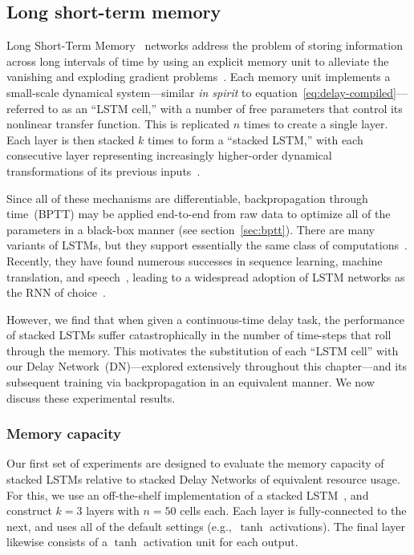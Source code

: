 \subsection{Long short-term memory}
\label{sec:delay-lstm}

Long Short-Term Memory~\citep[LSTM;][]{hochreiter1997long, gers1999learning} networks address the problem of storing information across long intervals of time by using an explicit memory unit to alleviate the vanishing and exploding gradient problems~\citep{bengio1994learning, bengio1994credit}.
Each memory unit implements a small-scale dynamical system---similar \emph{in spirit} to equation~\ref{eq:delay-compiled}---referred to as an ``LSTM cell,'' with a number of free parameters that control its nonlinear transfer function.
This is replicated $n$ times to create a single layer.
Each layer is then stacked $k$ times to form a ``stacked LSTM,'' with each consecutive layer representing increasingly higher-order dynamical transformations of its previous inputs~\citep{graves2013speech}.

Since all of these mechanisms are differentiable, backpropagation through time~(BPTT) may be applied end-to-end from raw data to optimize all of the parameters in a black-box manner (see section~\ref{sec:bptt}).
There are many variants of LSTMs, but they support essentially the same class of computations~\citep{jozefowicz2015empirical}.
Recently, they have found numerous successes in sequence learning, machine translation, and speech~\citep{graves2013speech, sutskever2014sequence, cho2014learning, bahdanau2014neural}, leading to a widespread adoption of LSTM networks as the RNN of choice~\citep{lecun2015deep}.

However, we find that when given a continuous-time delay task, the performance of stacked LSTMs suffer catastrophically in the number of time-steps that roll through the memory.
This motivates the substitution of each ``LSTM cell'' with our Delay Network~(DN)---explored extensively throughout this chapter---and its subsequent training via backpropagation in an equivalent manner.
We now discuss these experimental results.

\subsubsection{Memory capacity}

Our first set of experiments are designed to evaluate the memory capacity of stacked LSTMs relative to stacked Delay Networks of equivalent resource usage.
For this, we use an off-the-shelf implementation of a stacked LSTM~\citep[Keras;][]{gulli2017deep}, and construct $k=3$ layers with $n=50$ cells each.
Each layer is fully-connected to the next, and uses all of the default settings (e.g.,~$\tanh$ activations).
The final layer likewise consists of a $\tanh$ activation unit for each output.

